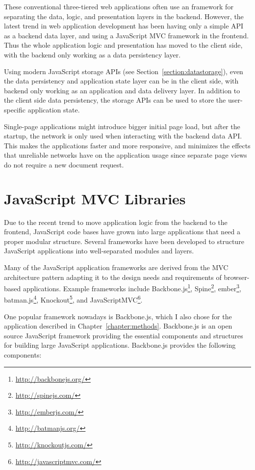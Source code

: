 These conventional three-tiered web applications
\cite{laine2011towards} often use an  \cite{gamma1995design}
framework for separating the data, logic, and presentation layers in
the backend. However, the latest trend in web application development
has been having only a simple 
\cite{fielding2000architectural} API as a backend data layer, and
using a JavaScript MVC framework in the frontend. Thus the whole
application logic and presentation has moved to the client side, with
the backend only working as a data persistency layer.

Using modern JavaScript storage APIs (see
Section~\ref{section:datastorage}), even the data persistency and
application state layer can be in the client side, with backend only
working as an application and data delivery layer. In addition to the
client side data persistency, the storage APIs can be used to store
the user-specific application state.

Single-page applications might introduce bigger initial page load, but
after the startup, the network is only used when interacting with the
backend data API. This makes the applications faster and more
responsive, and minimizes the effects that unreliable networks have on
the application usage since separate page views do not require a new
document request.

\section{JavaScript MVC Libraries}
\label{section:js-mvc}

Due to the recent trend to move application logic from the backend to
the frontend, JavaScript code bases have grown into large applications
that need a proper modular structure. Several frameworks have been
developed to structure JavaScript applications into well-separated
modules and layers.

Many of the JavaScript application frameworks are derived from the MVC
architecture pattern adapting it to the design needs and requirements
of browser-based applications. Example frameworks include
Backbone.js\footnote{\url{http://backbonejs.org/}},
Spine\footnote{\url{http://spinejs.com/}},
ember\footnote{\url{http://emberjs.com/}},
batman.js\footnote{\url{http://batmanjs.org/}},
Knockout\footnote{\url{http://knockoutjs.com/}}, and
JavaScriptMVC\footnote{\url{http://javascriptmvc.com/}}.

One popular framework nowadays is Backbone.js, which I also chose for
the application described in
Chapter~\ref{chapter:methods}. Backbone.js is an open source
JavaScript framework providing the essential components and structures
for building large JavaScript applications. Backbone.js provides the
following components:

